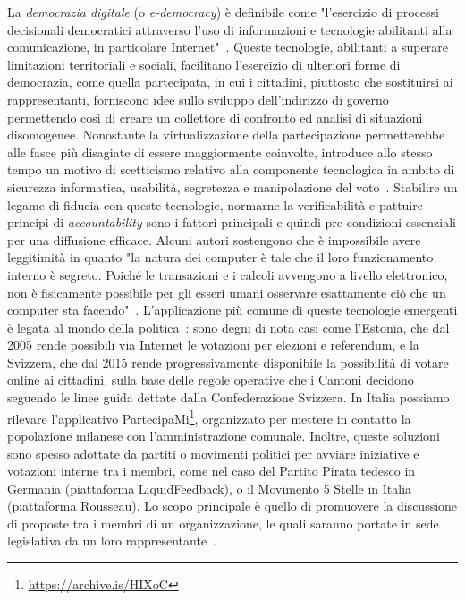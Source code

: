 \documentclass[12pt,a4paper,openright,twoside]{book}
\begin{document}
La \textit{democrazia digitale} (o \textit{e-democracy}) è definibile come "l'esercizio di processi decisionali democratici attraverso 
l'uso di informazioni e tecnologie abilitanti alla comunicazione, in particolare Internet"~\cite{rotzocki}.
Queste tecnologie, abilitanti a superare limitazioni territoriali e sociali,
facilitano l'esercizio di ulteriori forme di democrazia,
come quella partecipata, in cui i cittadini, piuttosto che
sostituirsi ai rappresentanti, forniscono idee sullo sviluppo dell'indirizzo di governo
permettendo così di creare un collettore di confronto ed analisi di situazioni disomogenee.
Nonostante la virtualizzazione della partecipazione permetterebbe alle fasce più disagiate di essere
maggiormente coinvolte, introduce allo stesso tempo un motivo di scetticismo relativo alla componente tecnologica
in ambito di sicurezza informatica, usabilità, segretezza e manipolazione del voto~\cite{aichholzer2020experience}.
Stabilire un legame di fiducia con queste tecnologie, normarne la verificabilità e pattuire principi di 
\textit{accountability} sono i fattori principali e quindi pre-condizioni essenziali
per una diffusione efficace. 
Alcuni autori sostengono che è impossibile avere leggitimità in quanto "la natura dei computer è tale che il loro funzionamento interno è segreto.
Poiché le transazioni e i calcoli avvengono a livello elettronico, 
non è fisicamente possibile per gli esseri umani osservare esattamente ciò che un computer sta facendo"~\cite{mcgaley}.
L'applicazione più comune di queste tecnologie emergenti è legata al mondo della politica~\cite{aichholzer2020experience}:
sono degni di nota casi come l'Estonia, che dal 2005 rende possibili via Internet le votazioni
per elezioni e referendum, e la Svizzera, che dal 2015 rende progressivamente disponibile la possibilità di votare online
ai cittadini, sulla base delle regole operative che i Cantoni decidono seguendo le linee guida dettate 
dalla Confederazione Svizzera.
In Italia possiamo rilevare l'applicativo PartecipaMi\footnote{\url{https://archive.is/HIXoC}},
organizzato per mettere in contatto la popolazione milanese con l'amministrazione comunale.
Inoltre, queste soluzioni sono spesso adottate da partiti o movimenti politici per avviare iniziative
e votazioni interne tra i membri, come nel caso del Partito Pirata tedesco in Germania (piattaforma LiquidFeedback),
o il Movimento 5 Stelle in Italia (piattaforma Rousseau). Lo scopo principale è quello di promuovere la discussione
di proposte tra i membri di un organizzazione, le quali saranno portate in sede legislativa da un loro rappresentante~\cite{korthagen2020non}.
\end{document}
